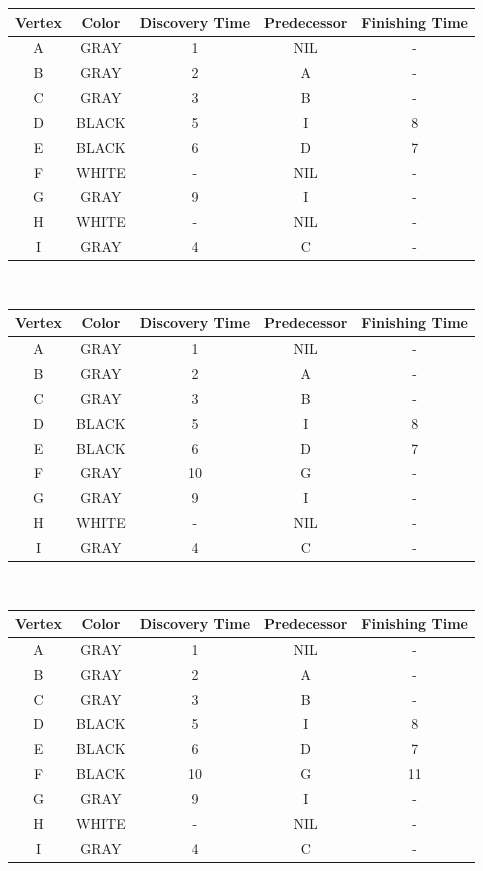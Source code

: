 \documentclass[12pt]{article}
\theoremstyle{plain}
\newcommand{\vs}{\vspace{2mm}}
\begin{document}
\begin{tabular}{|c|c|c|c|c|}
    \hline
    Vertex & Color & Discovery Time & Predecessor & Finishing Time \\ \hline
    A & GRAY & 1 & NIL & - \\ \hline
    B & GRAY & 2 & A & - \\ \hline
    C & GRAY & 3 & B & - \\ \hline
    D & BLACK & 5 & I & 8 \\ \hline
    E & BLACK & 6 & D & 7 \\ \hline
    F & WHITE & - & NIL & - \\ \hline
    G & GRAY & 9 & I & - \\ \hline
    H & WHITE & - & NIL & - \\ \hline
    I & GRAY & 4 & C & - \\ \hline
\end{tabular}
\vs\

\begin{tabular}{|c|c|c|c|c|}
    \hline
    Vertex & Color & Discovery Time & Predecessor & Finishing Time \\ \hline
    A & GRAY & 1 & NIL & - \\ \hline
    B & GRAY & 2 & A & - \\ \hline
    C & GRAY & 3 & B & - \\ \hline
    D & BLACK & 5 & I & 8 \\ \hline
    E & BLACK & 6 & D & 7 \\ \hline
    F & GRAY & 10 & G & - \\ \hline
    G & GRAY & 9 & I & - \\ \hline
    H & WHITE & - & NIL & - \\ \hline
    I & GRAY & 4 & C & - \\ \hline
\end{tabular}
\vs\

\begin{tabular}{|c|c|c|c|c|}
    \hline
    Vertex & Color & Discovery Time & Predecessor & Finishing Time \\ \hline
    A & GRAY & 1 & NIL & - \\ \hline
    B & GRAY & 2 & A & - \\ \hline
    C & GRAY & 3 & B & - \\ \hline
    D & BLACK & 5 & I & 8 \\ \hline
    E & BLACK & 6 & D & 7 \\ \hline
    F & BLACK & 10 & G & 11 \\ \hline
    G & GRAY & 9 & I & - \\ \hline
    H & WHITE & - & NIL & - \\ \hline
    I & GRAY & 4 & C & - \\ \hline
\end{tabular}
\vs\
\end{document}

